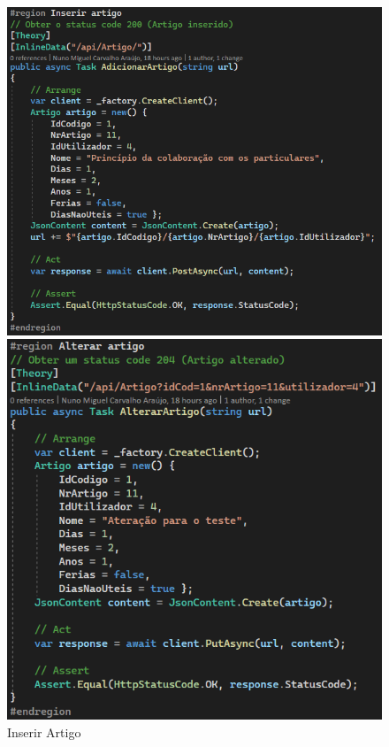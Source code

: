 \begin{figure}[!htbp]
  \centering
  \begin{minipage}[b]{0.4\textwidth}
    \includegraphics[width=\textwidth]{Figuras/TestesUnitarios/Artigo/Inserir Artigo.png}
    \caption{Inserir Artigo}
    \label{d.unitario}
  \end{minipage}
  \hfill
  \begin{minipage}[b]{0.4\textwidth}
    \includegraphics[width=\textwidth]{Figuras/TestesUnitarios/Artigo/Alterar Artigo.png}

\end{minipage}
\end{figure}
